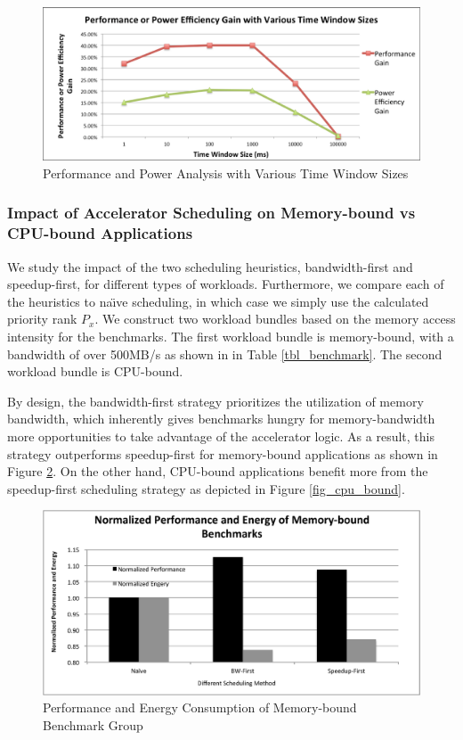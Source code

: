 \begin{figure}
    \centering
    \includegraphics[width=4.5in]{Time-Window-Size}
    \caption{Performance and Power Analysis with Various Time Window Sizes}
    \label{fig_time_window}
\end{figure}

\subsubsection{Impact of Accelerator Scheduling on Memory-bound vs CPU-bound Applications}

We study the impact of the two scheduling heuristics, bandwidth-first
and speedup-first, for different types of workloads. Furthermore, we compare each of the
heuristics to na\"{\i}ve scheduling, in which case we simply use the calculated priority
rank $P_x$.  We construct two workload bundles based on the memory
access intensity for the benchmarks. The first workload bundle is memory-bound, with a bandwidth of over 500MB/s as shown in 
in Table \ref{tbl_benchmark}. The second workload bundle is CPU-bound.

By design, the
bandwidth-first strategy prioritizes the utilization of memory
bandwidth, which inherently gives benchmarks hungry for memory-bandwidth
more opportunities to take advantage of the accelerator logic. As a result,
this strategy outperforms speedup-first for memory-bound
applications as shown in Figure \ref{fig_mem_bound}. On the other hand,
CPU-bound applications benefit more from the speedup-first
scheduling strategy as depicted in Figure \ref{fig_cpu_bound}.

\begin{figure}
    \centering
    \includegraphics[width=4.5in]{Memory-Bounded}
    \caption{Performance and Energy Consumption of Memory-bound Benchmark Group}
    \label{fig_mem_bound}
\end{figure}

